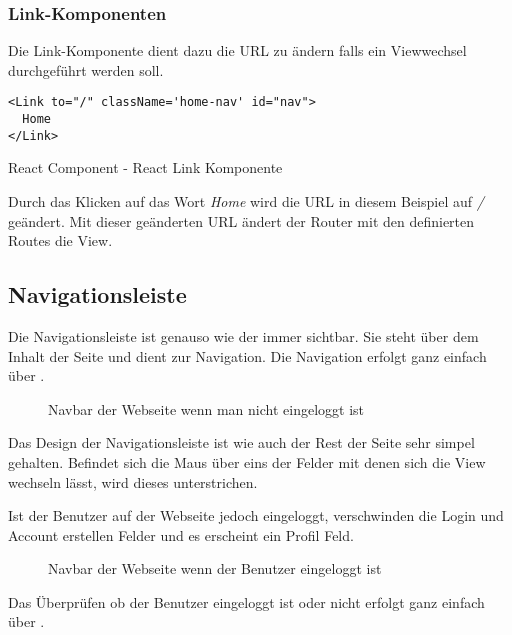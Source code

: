 \subsubsection{Link-Komponenten}
\label{React-Links}
Die Link-Komponente dient dazu die URL zu ändern falls ein Viewwechsel durchgeführt werden soll.
\begin{code}[htp]
\begin{lstlisting}
<Link to="/" className='home-nav' id="nav">
  Home
</Link>
\end{lstlisting}
\caption{React Component - React Link Komponente}
\end{code}
Durch das Klicken auf das Wort \textit{Home} wird die URL in diesem Beispiel auf \textit{/} geändert.
Mit dieser geänderten URL ändert der Router mit den definierten Routes die View.
\newpage
\subsection{Navigationsleiste}
\label{nav}

Die Navigationsleiste ist genauso wie der \underline{} immer sichtbar. Sie steht über dem Inhalt der Seite und 
dient zur Navigation. Die Navigation erfolgt ganz einfach über \underline{}.

\begin{figure}[H]
  \begin{center}
    \caption{Navbar der Webseite wenn man nicht eingeloggt ist}
  \end{center}
\end{figure}

Das Design der Navigationsleiste ist wie auch der Rest der Seite sehr simpel gehalten. Befindet sich
die Maus über eins der Felder mit denen sich die View wechseln lässt, wird dieses unterstrichen.


Ist der Benutzer auf der Webseite jedoch eingeloggt, verschwinden die Login und Account erstellen 
Felder und es erscheint ein Profil Feld.

\begin{figure}[H]
    \begin{center}
      \caption{Navbar der Webseite wenn der Benutzer eingeloggt ist}
    \end{center}
\end{figure}

Das Überprüfen ob der Benutzer eingeloggt ist oder nicht erfolgt ganz einfach über \underline{}.


